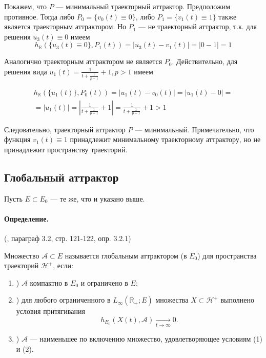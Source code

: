 Покажем, что $P$ --- минимальный траекторный аттрактор.
Предположим противное.
Тогда либо $P_0 =\{v_0(t) \equiv 0\}$, либо $P_1 =\{v_1(t) \equiv 1\}$ также является траекторным аттрактором.
Но $P_1$ --- не траекторный аттрактор, т.к. для решения $u_3(t) \equiv 0$ имеем
\begin{equation}
	h_{\mathbb{R}}(\{u_3(t) \equiv 0 \},P_1(t)) =
	|u_3(t) - v_1(t)| =
	|0-1| =
	1
\end{equation}

Аналогично траекторным аттрактором не является $P_0$.
Действительно, для решения вида $u_1(t)=\frac{1}{t+\frac{1}{p-1}}+1, p > 1$ имеем

\begin{multline}
	h_{\mathbb{R}}(\{u_1(t)\},P_0(t)) =
	|u_1(t) - v_0(t)| =
	|u_1(t) - 0| =
	\\ =
	|u_1(t)| =
	\left| \frac{1}{t+\frac{1}{p-1}}+1 \right| =
	\frac{1}{t+\frac{1}{p-1}}+1 >	1
\end{multline}

Следовательно, траекторный аттрактор $P$ --- минимальный.
Примечательно, что функция $v_1(t) \equiv 1$ принадлежит минимальному траекторному аттрактору,
но не принадлежит пространству траекторий.


\subsection{Глобальный аттрактор}

Пусть $E\subset E_0$ --- те же, что и указано выше.

\paragraph{Определение.} (\cite{Zelenaya}, параграф 3.2, стр. 121-122, опр. 3.2.1)

Множество  $\mathcal{A} \subset E $ называется глобальным аттрактором (в $E_0$) для пространства траекторий $\mathcal{H}^+$, если:
\begin{enumerate}
	\item)
		$\mathcal{A}$ компактно в $E_0$ и ограничено в $E$;
	\item)
		для любого ограниченного в $L_\infty(\mathbb{R}_+; E)$ множества $X \subset \mathcal{H}^+$
		выполнено условия притягивания
		$$
			h_{E_0}(X(t),\mathcal{A}) \xrightarrow[t\to \infty]{}{0}.
		$$
	\item)
		$\mathcal{A}$ --- наименьшее по включению множество, удовлетворяющее условиям (1) и (2).
\end{enumerate}


